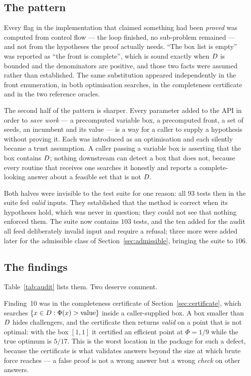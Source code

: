\documentclass[11pt,a4paper]{article}
\begin{document}
\subsection{The pattern}

Every flag in the implementation that claimed something had been \emph{proved}
was computed from control flow --- the loop finished, no sub-problem remained
--- and not from the hypotheses the proof actually needs.  ``The box list is
empty'' was reported as ``the front is complete'', which is sound exactly when
$D$ is bounded and the denominators are positive, and those two facts were
assumed rather than established.  The same substitution appeared independently
in the front enumeration, in both optimisation searches, in the completeness
certificate and in the two reference oracles.

The second half of the pattern is sharper.  Every parameter added to the API in
order to \emph{save work} --- a precomputed variable box, a precomputed front,
a set of seeds, an incumbent and its value --- is a way for a caller to supply
a hypothesis without proving it.  Each was introduced as an optimisation and
each silently became a trust assumption.  A caller passing a variable box is
asserting that the box contains $D$; nothing downstream can detect a box
that does not, because every routine that receives one searches it honestly and
reports a complete-looking answer about a feasible set that is not $D$.

Both halves were invisible to the test suite for one reason: all $93$ tests
then in the suite fed \emph{valid} inputs.  They established that the method is
correct when its hypotheses hold, which was never in question; they could not
see that nothing enforced them.  The suite now contains $103$ tests, and the
ten added for the audit all feed deliberately invalid input and require a
refusal; three more were added later for the admissible class of
Section~\ref{sec:admissible}, bringing the suite to $106$.

\subsection{The findings}

Table~\ref{tab:audit} lists them.  Two deserve comment.

Finding~10 was in the completeness certificate of
Section~\ref{sec:certificate}, which searches $\{x \in D : \Phi(x) >
\text{value}\}$ inside a caller-supplied box.  A box smaller than $D$ hides
challengers, and the certificate then returns \emph{valid} on a point that is
not optimal: with the box $[1,1]$ it certified an efficient point at $\Phi =
1/9$ while the true optimum is $5/17$.  This is the worst location in the
package for such a defect, because the certificate is what validates answers
beyond the size at which brute force reaches --- a false proof is not a wrong
answer but a wrong \emph{check} on other answers.
\end{document}
